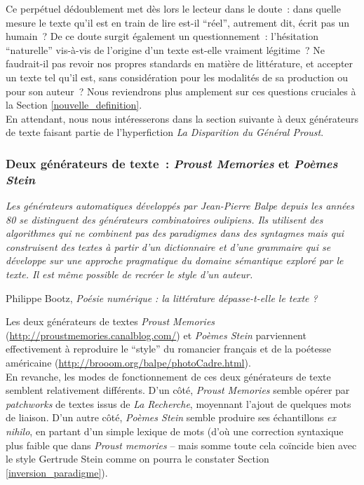 \documentclass{article}
\newenvironment{citationbox}
{\begin{center}
		\begin{minipage}{.8\textwidth}
		}
		{
		\end{minipage}	
\end{center}
}
\begin{document}
					Ce perpétuel dédoublement met dès lors le lecteur dans le doute : dans quelle mesure le texte qu'il est en train de lire est-il ``réel'', autrement dit, écrit pas un humain ? De ce doute surgit également un questionnement : l'hésitation ``naturelle'' vis-à-vis de l'origine d'un texte est-elle vraiment légitime ? Ne faudrait-il pas revoir nos propres standards en matière de littérature, et accepter un texte tel qu'il est, sans considération pour les modalités de sa production ou pour son auteur ? Nous reviendrons plus amplement sur ces questions cruciales à la Section \ref{nouvelle_definition}.\\
					
					En attendant, nous nous intéresserons  dans la section suivante à deux générateurs de texte faisant partie de l'hyperfiction \textit{La Disparition du Général Proust}.
			
			\subsubsection{Deux générateurs de texte~: \textit{Proust Memories} et \textit{Poèmes Stein}}
				\begin{citationbox}
					\textit{Les générateurs automatiques développés par Jean-Pierre Balpe depuis les années 80
					se distinguent des générateurs combinatoires oulipiens. Ils utilisent des algorithmes qui ne
					combinent pas des paradigmes dans des syntagmes mais qui construisent des textes à partir
					d’un dictionnaire et d’une grammaire qui se développe sur une approche pragmatique du
					domaine sémantique exploré par le texte. Il est même possible de recréer le style d’un auteur. }
					\begin{flushright}
						Philippe Bootz, \textit{Poésie numérique : la littérature dépasse-t-elle le
						texte ?}\cite{bootz2005}
					\end{flushright}
				\end{citationbox}
				Les deux générateurs de textes \textit{Proust Memories} (\href{http://proustmemories.canalblog.com/}{http://proustmemories.canalblog.com/}) et \textit{Poèmes Stein} parviennent effectivement à reproduire le ``style'' du romancier français et de la poétesse américaine (\href{http://brooom.org/balpe/photoCadre.html}{http://brooom.org/balpe/photoCadre.html}).\\ 
				
				En revanche, les modes de fonctionnement de ces deux générateurs de texte semblent relativement différents. D'un côté, \textit{Proust Memories} semble opérer par \textit{patchworks} de textes issus de \textit{La Recherche}, moyennant l'ajout de quelques mots de liaison. D'un autre côté, \textit{Poèmes Stein} semble produire ses échantillons \textit{ex nihilo}, en partant d'un simple lexique de mots (d'où une correction syntaxique plus faible que dans \textit{Proust memories} -- mais somme toute cela coïncide bien avec le style Gertrude Stein comme on pourra le constater Section \ref{inversion_paradigme}). 
				
\end{document}
